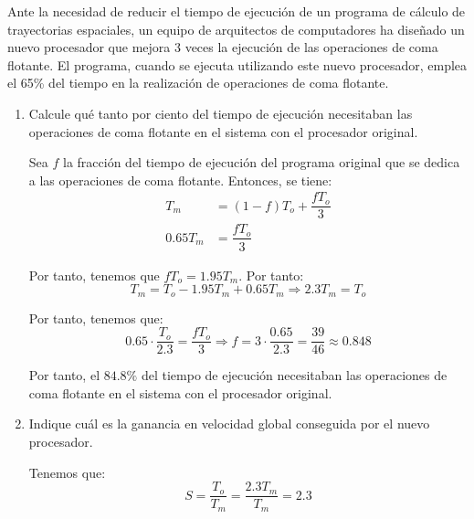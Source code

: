 \begin{comment}
SOLUCIÓN:
\begin{enumerate}
    \item La fracción paralelizable es $f = 0,8$.
    \item El tiempo de ejecución del simulador en el procesador es 108,3s.
    \item El objetivo no se puede conseguir con 30 procesadores, ya que el tiempo de ejecución conseguido sería de 73,7s.
    \item La propuesta no es válida, ya que el tiempo de ejecución conseguido sería de 81,25s.
\end{enumerate}
\end{comment}

\begin{ejercicio}
Ante la necesidad de reducir el tiempo de ejecución de un programa de cálculo de trayectorias espaciales, un equipo de arquitectos de computadores ha diseñado un nuevo procesador que mejora 3 veces la ejecución de las operaciones de coma flotante. El programa, cuando se ejecuta utilizando este nuevo procesador, emplea el 65\% del tiempo en la realización de operaciones de coma flotante.
\begin{enumerate}
    \item Calcule qué tanto por ciento del tiempo de ejecución necesitaban las operaciones de coma flotante en el sistema con el procesador original.
    
    Sea $f$ la fracción del tiempo de ejecución del programa original que se dedica a las operaciones de coma flotante. Entonces, se tiene:
    \begin{align*}
        T_m &= (1-f)T_o + \dfrac{fT_o}{3}\\
        0.65T_m &= \dfrac{fT_o}{3}
    \end{align*}

    Por tanto, tenemos que $fT_o=1.95T_m$. Por tanto:
    \begin{equation*}
        T_m = T_o - 1.95T_m + 0.65T_m\Longrightarrow
        2.3T_m = T_o
    \end{equation*}

    Por tanto, tenemos que:
    \begin{equation*}
        0.65\cdot \dfrac{T_o}{2.3} = \dfrac{fT_o}{3}\Longrightarrow
        f = 3\cdot \dfrac{0.65}{2.3} = \dfrac{39}{46}\approx 0.848
    \end{equation*}

    Por tanto, el $84.8\%$ del tiempo de ejecución necesitaban las operaciones de coma flotante en el sistema con el procesador original.
    \item Indique cuál es la ganancia en velocidad global conseguida por el nuevo procesador.
    
    Tenemos que:
    \begin{equation*}
        S = \dfrac{T_o}{T_m} = \dfrac{2.3T_m}{T_m} = 2.3
    \end{equation*}
\end{enumerate}
\end{ejercicio}
